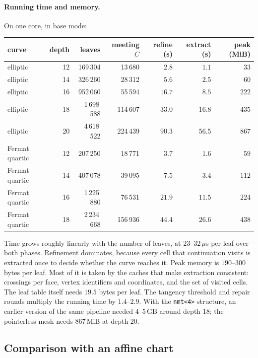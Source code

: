 \documentclass[11pt]{article}
\theoremstyle{plain}
\theoremstyle{definition}
\theoremstyle{remark}
\begin{document}
\paragraph{Running time and memory.}
On one core, in base mode:
\begin{center}
\small
\begin{tabular}{@{}lrrrrrr@{}}
\toprule
curve & depth & leaves & meeting $C$ & refine (s) & extract (s) & peak (MiB) \\
\midrule
elliptic & 12 & 169\,304 & 13\,680 & $2.8$ & $1.1$ & $33$ \\
elliptic & 14 & 326\,260 & 28\,312 & $5.6$ & $2.5$ & $60$ \\
elliptic & 16 & 952\,060 & 55\,594 & $16.7$ & $8.5$ & $222$ \\
elliptic & 18 & 1\,698\,588 & 114\,607 & $33.0$ & $16.8$ & $435$ \\
elliptic & 20 & 4\,618\,522 & 224\,439 & $90.3$ & $56.5$ & $867$ \\
Fermat quartic & 12 & 207\,250 & 18\,771 & $3.7$ & $1.6$ & $59$ \\
Fermat quartic & 14 & 407\,078 & 39\,095 & $7.5$ & $3.4$ & $112$ \\
Fermat quartic & 16 & 1\,225\,880 & 76\,531 & $21.9$ & $11.5$ & $224$ \\
Fermat quartic & 18 & 2\,234\,668 & 156\,936 & $44.4$ & $26.6$ & $438$ \\
\bottomrule
\end{tabular}
\end{center}
Time grows roughly linearly with the number of leaves, at $23$--$32\,\mu$s
per leaf over both phases. Refinement dominates, because every cell that
continuation visits is extracted once to decide whether the curve
reaches it. Peak memory is $190$--$300$ bytes per leaf. Most of it is
taken by the caches that make extraction consistent: crossings per face,
vertex identifiers and coordinates, and the set of visited cells. The
leaf table itself needs $19.5$ bytes per leaf. The tangency threshold and
repair rounds multiply the running time by $1.4$--$2.9$. With the
\texttt{nmt<4>} structure, an earlier version of the same pipeline
needed $4$--$5$\,GB around depth $18$; the pointerless mesh needs
$867$\,MiB at depth $20$.


\subsection{Comparison with an affine chart}
\label{sec:exp-affine}
\end{document}
